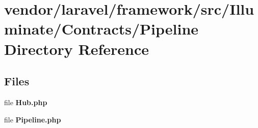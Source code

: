\section{vendor/laravel/framework/src/\+Illuminate/\+Contracts/\+Pipeline Directory Reference}
\label{dir_99eba50e575e56e2ec791dcab138fe0a}
\subsection*{Files}
\begin{DoxyCompactItemize}
\item 
file {\bf Hub.\+php}
\item 
file {\bf Pipeline.\+php}
\end{DoxyCompactItemize}
